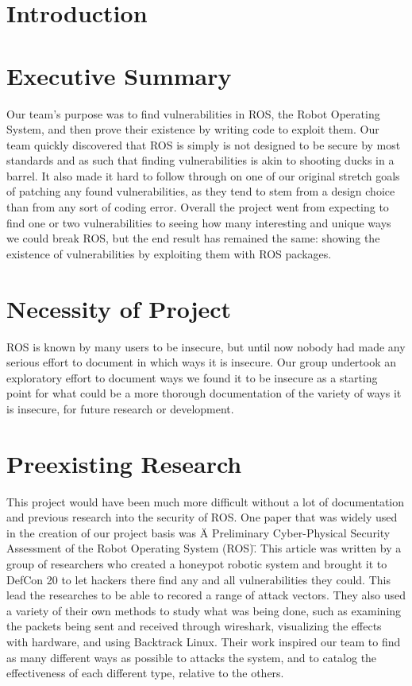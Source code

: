 \documentclass[IEEEtran,letterpaper,10pt,notitlepage,draftclsnofoot,onecolumn]{article}
\begin{document}
\newpage
{}
\tableofcontents
\clearpage

\section{Introduction}

\section{Executive Summary}
Our team’s purpose was to find vulnerabilities in ROS, the Robot Operating System, and then prove their existence by writing code to exploit them. 
Our team quickly discovered that ROS is simply is not designed to be secure by most standards and as such that finding vulnerabilities is akin to shooting ducks in a barrel. 
It also made it hard to follow through on one of our original stretch goals of patching any found vulnerabilities, as they tend to stem from a design choice than from any sort of coding error. 
Overall the project went from expecting to find one or two vulnerabilities to seeing how many interesting and unique ways we could break ROS, but the end result has remained the same: showing the existence of vulnerabilities by exploiting them with ROS packages.


\section{Necessity of Project}
ROS is known by many users to be insecure, but until now nobody had made any serious effort to document in which ways it is insecure. 
Our group undertook an exploratory effort to document ways we found it to be insecure as a starting point for what could be a more thorough documentation of the variety of ways it is insecure, for future research or development. 

\section{Preexisting Research}
This project would have been much more difficult without a lot of documentation and previous research into the security of ROS.
One paper that was widely used in the creation of our project basis was \"A Preliminary Cyber-Physical Security Assessment of the Robot
Operating System (ROS)\". \cite{mainROS}
This article was written by a group of researchers who created a honeypot robotic system and brought it to DefCon 20 to let hackers there find any and all vulnerabilities they could.
This lead the researches to be able to recored a range of attack vectors.
They also used a variety of their own methods to study what was being done, such as examining the packets being sent and received through wireshark, visualizing the effects with hardware, and using Backtrack Linux.
Their work inspired our team to find as many different ways as possible to attacks the system, and to catalog the effectiveness of each different type, relative to the others.
\end{document}
